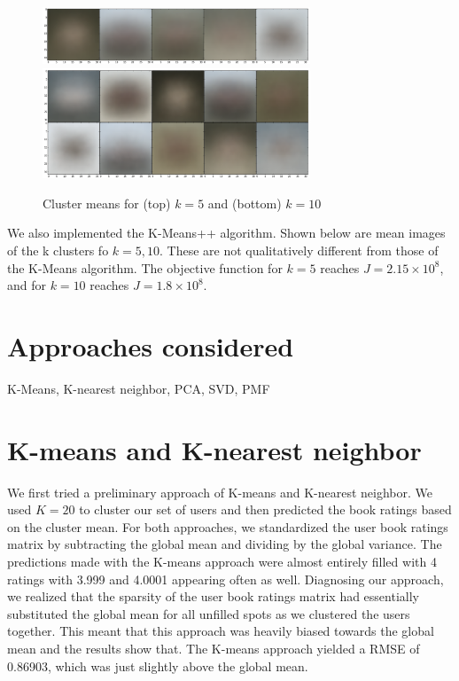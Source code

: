 \documentclass[11pt]{amsart}
\begin{document}
\begin{figure}[h]
	\centering
	\includegraphics[width=8cm]{images/kplus5us.png}\\
	\includegraphics[width=8cm]{images/kplus10us.png}\\
	\caption{Cluster means for (top) $k=5$ and (bottom) $k=10$}
\end{figure}

We also implemented the K-Means++ algorithm. Shown below are mean images of the k clusters fo $k=5,10$. These are not qualitatively different from those of the K-Means algorithm. The objective function for $k=5$ reaches $J=2.15\times 10^{8}$, and for $k=10$ reaches $J=1.8\times 10^{8}$.

\section{Approaches considered}
\begin{center}K-Means, K-nearest neighbor, PCA, SVD, PMF\end{center}

\section{K-means and K-nearest neighbor}
We first tried a preliminary approach of K-means and K-nearest neighbor. We used $K = 20$ to cluster our set of users and then predicted the book ratings based on the cluster mean. For both approaches, we standardized the user book ratings matrix by subtracting the global mean and dividing by the global variance. The predictions made with the K-means approach were almost entirely filled with 4 ratings with 3.999 and 4.0001 appearing often as well. Diagnosing our approach, we realized that the sparsity of the user book ratings matrix had essentially substituted the global mean for all unfilled spots as we clustered the users together. This meant that this approach was heavily biased towards the global mean and the results show that. The K-means approach yielded a RMSE of 0.86903, which was just slightly above the global mean.
\end{document}
